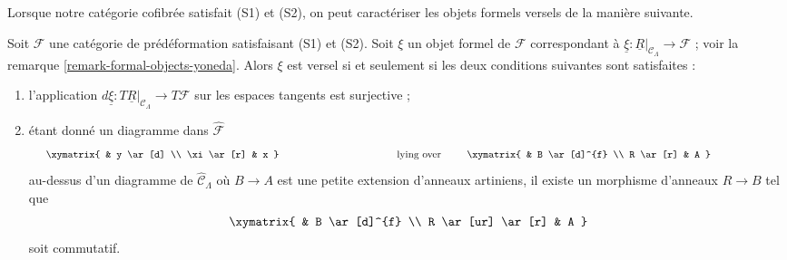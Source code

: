 \noindent
Lorsque notre catégorie cofibrée satisfait (S1) et (S2), on peut caractériser
les objets formels versels de la manière suivante.

\begin{lemma}
\label{lemma-versal-criterion}
Soit $\mathcal{F}$ une catégorie de prédéformation satisfaisant (S1) et (S2).
Soit $\xi$ un objet formel de $\mathcal{F}$ correspondant à
$\underline{\xi} : \underline{R}|_{\mathcal{C}_\Lambda} \to \mathcal{F}$ ;
voir la remarque \ref{remark-formal-objects-yoneda}. Alors $\xi$ est versel
si et seulement si les deux conditions suivantes sont satisfaites :
\begin{enumerate}
\item l'application
$d\underline{\xi} : T\underline{R}|_{\mathcal{C}_\Lambda} \to T\mathcal{F}$
sur les espaces tangents est surjective ;
\item étant donné un diagramme dans $\widehat{\mathcal{F}}$
$$
\vcenter{
\xymatrix{
            &  y \ar[d] \\
\xi \ar[r]  &  x
}
}
\quad\text{lying over}\quad
\vcenter{
\xymatrix{
         &   B  \ar[d]^{f} \\
R \ar[r] &   A
}
}
$$
au-dessus d'un diagramme de $\widehat{\mathcal{C}}_\Lambda$ où $B \to A$ est
une petite extension d'anneaux artiniens, il existe un morphisme d'anneaux
$R \to B$ tel que
$$
\xymatrix{
         &   B  \ar[d]^{f} \\
R \ar[ur] \ar[r] &   A
}
$$
soit commutatif.
\end{enumerate}
\end{lemma}

